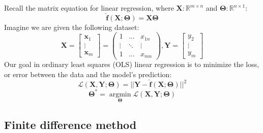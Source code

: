 \documentclass[12pt,initial,twoside,maitrise]{dms}
\numberwithin{equation}{section}
\numberwithin{table}{chapter}
\numberwithin{figure}{chapter}
\begin{document}
\noindent Recall the matrix equation for linear regression, where $\mathbf{X}: \mathbb{R}^{m \times n}$ and $\bm\Theta: \mathbb{R}^{n \times 1}$:
%
\begin{equation}
\mathbf{\hat f}(\mathbf{X}; \bm\Theta) = \mathbf{X}\bm\Theta
\end{equation}
%
Imagine we are given the following dataset:
%
\begin{equation}
\mathbf{X} =
\begin{bmatrix}
\mathbf{x}_1 \\
\vdots \\
\mathbf{x}_m
\end{bmatrix} =
\begin{pmatrix}
1 & \ldots & x_{1n} \\
\vdots & \ddots & \vdots \\
1 & \ldots & x_{mn}
\end{pmatrix},
\mathbf{Y} =
\begin{bmatrix}
y_2 \\
\vdots \\
y_m
\end{bmatrix}
\end{equation}
%
Our goal in ordinary least squares (OLS) linear regression is to minimize the loss, or error between the data and the model's prediction:
%
\begin{equation}
\mathcal{L}(\mathbf{X}, \mathbf{Y}; \bm\Theta) = ||\mathbf{Y} - \mathbf{\hat f}(\mathbf{X}; \bm\Theta)||^2
\end{equation}
%
\begin{equation}
\bm\Theta^* = \underset{\bm\Theta}{\operatorname{argmin}}\mathcal{L}(\mathbf{X}, \mathbf{Y}; \bm\Theta)
\end{equation}

\subsection{Finite difference method}\label{sec:fdm}
\end{document}
